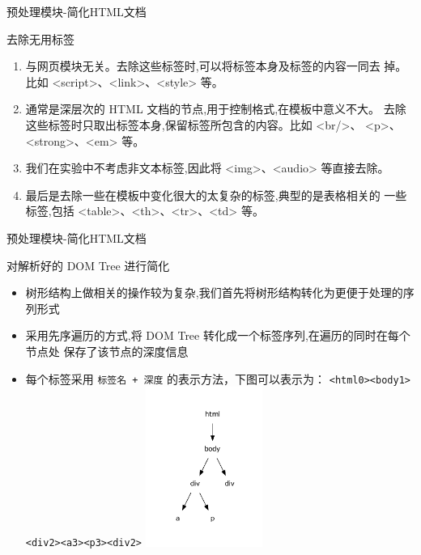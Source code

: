 \documentclass[presentation]{beamer}
\begin{document}
\begin{frame}[label=sec-2-4]{预处理模块-简化HTML文档}
\begin{block}{去除无用标签}
\begin{enumerate}
\item 与网页模块无关。去除这些标签时,可以将标签本身及标签的内容一同去
掉。比如 <script>、<link>、<style> 等。
\item 通常是深层次的 HTML 文档的节点,用于控制格式,在模板中意义不大。
去除这些标签时只取出标签本身,保留标签所包含的内容。比如 <br/>、
<p>、<strong>、<em> 等。
\item 我们在实验中不考虑非文本标签,因此将 <img>、<audio> 等直接去除。
\item 最后是去除一些在模板中变化很大的太复杂的标签,典型的是表格相关的
一些标签,包括 <table>、<th>、<tr>、<td> 等。
\end{enumerate}
\end{block}
\end{frame}

\begin{frame}[fragile,label=sec-2-5]{预处理模块-简化HTML文档}
 \begin{block}{对解析好的 DOM Tree 进行简化}
\begin{itemize}
\item 树形结构上做相关的操作较为复杂,我们首先将树形结构转化为更便于处理的序列形式
\item 采用先序遍历的方式,将 DOM Tree 转化成一个标签序列,在遍历的同时在每个节点处
保存了该节点的深度信息
\item 每个标签采用 \texttt{标签名 + 深度} 的表示方法，下图可以表示为：
      \texttt{<html0><body1><div2><a3><p3><div2>}
\includegraphics[width=0.3\textwidth]{./domtree.pdf}
\end{itemize}
\end{block}
\end{frame}
\end{document}
